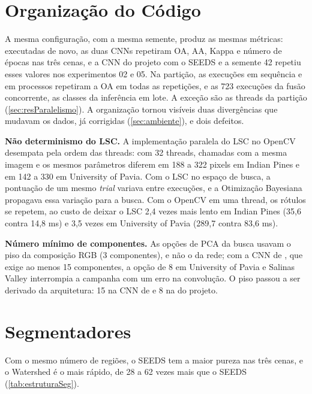 \section{Organização do Código}
\label{sec:resOrganizacao}

A mesma configuração, com a mesma semente, produz as mesmas métricas: executadas de novo, as duas CNNs repetiram OA, AA, Kappa e número de épocas nas três cenas, e a CNN do projeto com o SEEDS e a semente 42 repetiu esses valores nos experimentos 02 e 05. Na partição, as execuções em sequência e em processos repetiram a OA em todas as repetições, e as 723 execuções da fusão concorrente, as classes da inferência em lote. A exceção são as threads da partição (\autoref{sec:resParalelismo}). A organização tornou visíveis duas divergências que mudavam os dados, já corrigidas (\autoref{sec:ambiente}), e dois defeitos.

\textbf{Não determinismo do LSC.} A implementação paralela do LSC no OpenCV desempata pela ordem das threads: com 32 threads, chamadas com a mesma imagem e os mesmos parâmetros diferem em 188 a 322 pixels em Indian Pines e em 142 a 330 em University of Pavia. Com o LSC no espaço de busca, a pontuação de um mesmo \textit{trial} variava entre execuções, e a Otimização Bayesiana propagava essa variação para a busca. Com o OpenCV em uma thread, os rótulos se repetem, ao custo de deixar o LSC 2,4 vezes mais lento em Indian Pines (35,6 contra 14,8 ms) e 3,5 vezes em University of Pavia (289,7 contra 83,6 ms).

\textbf{Número mínimo de componentes.} As opções de PCA da busca usavam o piso da composição RGB (3 componentes), e não o da rede; com a CNN de , que exige ao menos 15 componentes, a opção de 8 em University of Pavia e Salinas Valley interrompia a campanha com um erro na convolução. O piso passou a ser derivado da arquitetura: 15 na CNN de  e 8 na do projeto.

\section{Segmentadores}
\label{sec:resSegmentadores}

Com o mesmo número de regiões, o SEEDS tem a maior pureza nas três cenas, e o Watershed é o mais rápido, de 28 a 62 vezes mais que o SEEDS (\autoref{tab:estruturaSeg}).

